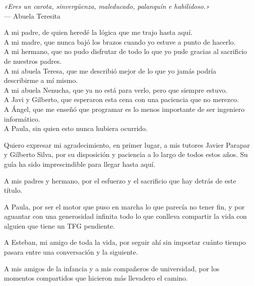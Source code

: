 \documentclass[11pt,a4paper,titlepage,oneside]{report}
\begin{document}

 
 \thispagestyle{empty}
 \vspace*{4cm}
 \begin{flushright}
   \emph{«Eres un carota, sinvergüenza, maleducado, palanquín e habilidoso.»}\\[0.4em]
   --- Abuela Teresita
 \end{flushright}

 \vspace{2.5cm}

 \begin{flushright}
   A mi padre, de quien heredé la lógica que me trajo hasta aquí.\\[0.6em]
   A mi madre, que nunca bajó los brazos cuando yo estuve a punto de hacerlo.\\[0.6em]
   A mi hermano, que no pudo disfrutar de todo lo que yo pude gracias al sacrificio de nuestros padres.\\[0.6em]
   A mi abuela Teresa, que me describió mejor de lo que yo jamás podría describirme a mí mismo.\\
   A mi abuela Nenucha, que ya no está para verlo, pero que siempre estuvo.\\[0.6em]
   A Javi y Gilberto, que esperaron esta cena con una paciencia que no merezco.\\[0.6em]
   A Ángel, que me enseñó que programar es lo menos importante de ser ingeniero informático.\\[0.6em]
   A Paula, sin quien esto nunca hubiera ocurrido.
 \end{flushright}
 \newpage
 \paxinaenbranco
 \begin{agradecementos}
  Quiero expresar mi agradecimiento, en primer lugar, a mis tutores Javier Parapar y Gilberto Silva,
  por su disposición y paciencia a lo largo de todos estos años. Su guía ha sido imprescindible para
  llegar hasta aquí.

  A mis padres y hermano, por el esfuerzo y el sacrificio que hay detrás de este título.

  A Paula, por ser el motor que puso en marcha lo que parecía no tener fin, y por aguantar con una
  generosidad infinita todo lo que conlleva compartir la vida con alguien que tiene un TFG pendiente.

  A Esteban, mi amigo de toda la vida, por seguir ahí sin importar cuánto tiempo pasara entre una
  conversación y la siguiente.

  A mis amigos de la infancia y a mis compañeros de universidad, por los momentos compartidos que
  hicieron más llevadero el camino.
 \end{agradecementos}
 
\end{document}
